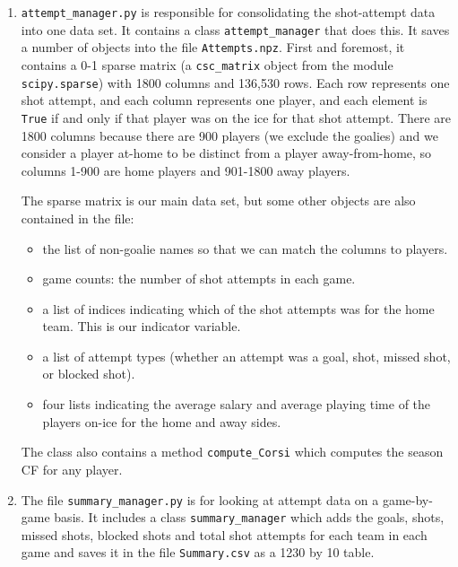 \documentclass[11pt]{article}
\begin{document}
\begin{enumerate}
\def\labelenumi{\arabic{enumi}.}
\item
  \texttt{attempt\_manager.py} is responsible for consolidating the
  shot-attempt data into one data set. It contains a class
  \texttt{attempt\_manager} that does this. It saves a number of objects
  into the file \texttt{Attempts.npz}. First and foremost, it contains a
  0-1 sparse matrix (a \texttt{csc\_matrix} object from the module
  \texttt{scipy.sparse}) with 1800 columns and 136,530 rows. Each row
  represents one shot attempt, and each column represents one player,
  and each element is \texttt{True} if and only if that player was on
  the ice for that shot attempt. There are 1800 columns because there
  are 900 players (we exclude the goalies) and we consider a player
  at-home to be distinct from a player away-from-home, so columns 1-900
  are home players and 901-1800 away players.

  The sparse matrix is our main data set, but some other objects are
  also contained in the file:

  \begin{itemize}
  \itemsep1pt\parskip0pt
  \item
    the list of non-goalie names so that we can match the columns to
    players.
  \item
    game counts: the number of shot attempts in each game.
  \item
    a list of indices indicating which of the shot attempts was for the
    home team. This is our indicator variable.
  \item
    a list of attempt types (whether an attempt was a goal, shot, missed
    shot, or blocked shot).
  \item
    four lists indicating the average salary and average playing time of
    the players on-ice for the home and away sides.
  \end{itemize}

  The class also contains a method \texttt{compute\_Corsi} which
  computes the season CF for any player.
\item
  The file \texttt{summary\_manager.py} is for looking at attempt data
  on a game-by-game basis. It includes a class \texttt{summary\_manager}
  which adds the goals, shots, missed shots, blocked shots and total
  shot attempts for each team in each game and saves it in the file
  \texttt{Summary.csv} as a 1230 by 10 table.
\end{enumerate}
\end{document}
